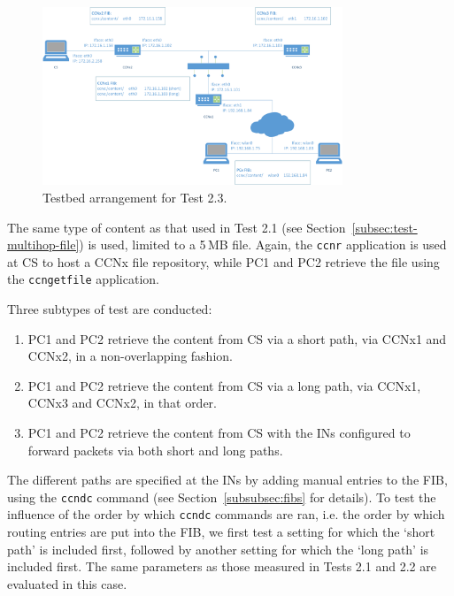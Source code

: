 \begin{figure}[h!]

    \centering
    \includegraphics[width=0.80\textwidth]{figures/diag2.png}
    \cprotect\caption{Testbed arrangement for Test 2.3.}
    \label{fig:testbed-multiple-paths}

\end{figure}

The same type of content as that used in Test 2.1 (see 
Section~\ref{subsec:test-multihop-file}) is used, 
limited to a 5\,MB file. 
Again, the \verb+ccnr+ application is used at CS to host a CCNx file 
repository, while PC1 and PC2 retrieve the file using the \verb+ccngetfile+ 
application.\vertbreak 

Three subtypes of test are conducted: 

\begin{enumerate}

    \item PC1 and PC2 retrieve the content from CS via a short path, 
        via CCNx1 and CCNx2, in a non-overlapping fashion.
    \item PC1 and PC2 retrieve the content from CS via a long path, via 
        CCNx1, CCNx3 and CCNx2, in that order.
    \item PC1 and PC2 retrieve the content from CS with the INs configured 
        to forward packets via both short and long paths.

\end{enumerate}

The different paths are specified at the INs by adding manual entries to the 
FIB, using the \verb+ccndc+ command (see Section~\ref{subsubsec:fibs} for 
details). To test the influence of the order by which \verb+ccndc+ commands 
are ran, i.e. the order by which routing entries are put into the FIB, we 
first test a setting for which the `short path' is included first, followed 
by another setting for which the `long path' is included first. The same 
parameters as those measured in Tests 2.1 and 2.2 are evaluated in this case.


